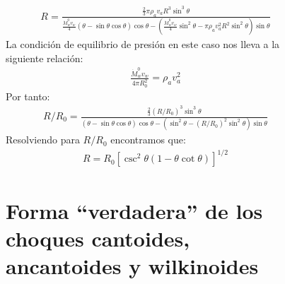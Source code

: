 \begin{figure}
\small
\begin{align}
  R = \frac{\frac{2}{3}\pi\rho_a v_a R^3 \sin^3\theta}{\frac{\dot{M}^0_w v_w}{4}\left(\theta-\sin\theta\cos\theta\right)\cos\theta
  - \left(\frac{\dot{M}^0_w v_w}{4}\sin^2\theta - \pi\rho_a v^2_a R^2 \sin^2\theta\right)\sin\theta}
\end{align}
\normalsize
La condición de equilibrio de presión en este caso nos lleva a la siguiente relación:
\begin{align}
  \frac{\dot{M}^0_w v_w}{4\pi R^2_0} = \rho_a v^2_a \label{eq:Wilkin-stagnation}
\end{align}
Por tanto:
\begin{align}
  R/R_0 = \frac{\frac{2}{3}\left(R/R_0\right)^3 \sin^3\theta}{\left(\theta-\sin\theta\cos\theta\right)\cos\theta
  - \left(\sin^2\theta - \left(R/R_0\right)^2 \sin^2\theta\right)\sin\theta}
\end{align}
Resolviendo para $R/R_0$ encontramos que:
\begin{align}
  R = R_0\left[\csc^2\theta\left(1 - \theta\cot\theta\right)\right]^{1/2} \label{eq:R-Wilkin}
\end{align}


\section{Forma ``verdadera'' de los choques cantoides, ancantoides y wilkinoides}


\end{figure}
